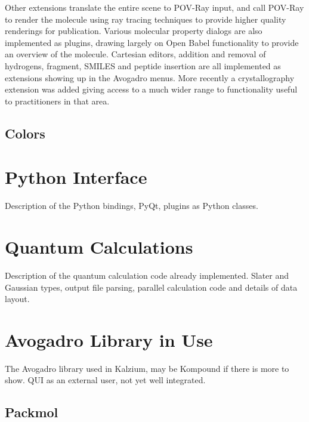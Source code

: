 \documentclass[10pt]{bmc_article}
\newenvironment{bmcformat}{\begin{raggedright}
\baselineskip20pt\sloppy\setboolean{publ}{false}}{\end{raggedright}
\baselineskip20pt\sloppy}
\begin{document}
\begin{bmcformat}
Other extensions translate the entire scene to POV-Ray input, and call POV-Ray
to render the molecule using ray tracing techniques to provide higher quality
renderings for publication. Various molecular property dialogs are also
implemented as plugins, drawing largely on Open Babel functionality to provide
an overview of the molecule. Cartesian editors, addition and removal of
hydrogens, fragment, SMILES and peptide insertion are all implemented as
extensions showing up in the Avogadro menus. More recently a crystallography
extension was added giving access to a much wider range to functionality
useful to practitioners in that area.

\subsection{Colors} %

\section{Python Interface} %

Description of the Python bindings, PyQt, plugins as Python classes.

\section{Quantum Calculations}

Description of the quantum calculation code already implemented. Slater and
Gaussian types, output file parsing, parallel calculation code and details of
data layout.

\section{Avogadro Library in Use}

The Avogadro library used in Kalzium, may be Kompound if there is more to show.
QUI as an external user, not yet well integrated.

\subsection{Packmol}


\end{bmcformat}
\end{document}
